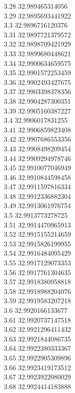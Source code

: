 {3.28	32.989465314056\\
3.29	32.9895693441922\\
3.3	32.9896716120376\\
3.31	32.9897721379572\\
3.32	32.9898709421929\\
3.33	32.9899680448621\\
3.34	32.9900634659575\\
3.35	32.9901572253459\\
3.36	32.9902493427675\\
3.37	32.9903398378356\\
3.38	32.9904287300351\\
3.39	32.9905160387227\\
3.4	32.9906017831255\\
3.41	32.9906859823408\\
3.42	32.9907686553356\\
3.43	32.9908498209454\\
3.44	32.9909294978746\\
3.45	32.9910077046949\\
3.46	32.9910844598458\\
3.47	32.9911597816334\\
3.48	32.9912336882304\\
3.49	32.9913061976754\\
3.5	32.9913773278725\\
3.51	32.9914470965913\\
3.52	32.9915155214659\\
3.53	32.9915826199955\\
3.54	32.9916484095429\\
3.55	32.9917129073353\\
3.56	32.9917761304635\\
3.57	32.9918380958818\\
3.58	32.9918988204076\\
3.59	32.9919583207218\\
3.6	32.9920166133677\\
3.61	32.9920737147518\\
3.62	32.9921296411432\\
3.63	32.9921844086735\\
3.64	32.9922380333367\\
3.65	32.9922905309896\\
3.66	32.9923419173512\\
3.67	32.9923922080029\\
3.68	32.9924414183888\\
}
